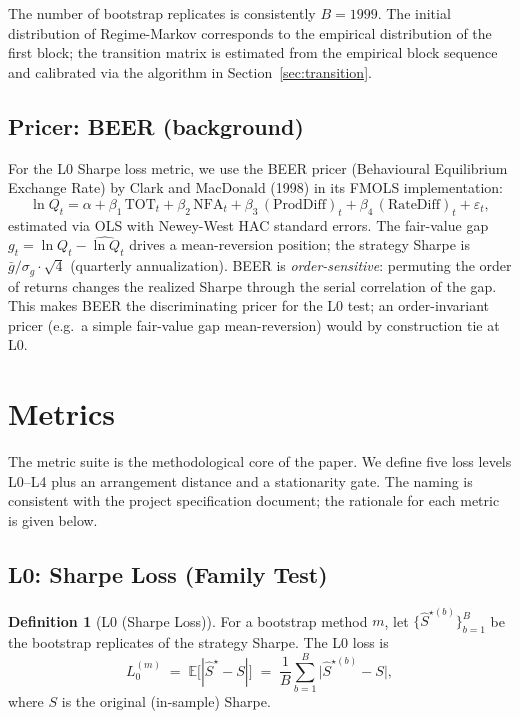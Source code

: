 \documentclass[11pt,a4paper]{article}
\theoremstyle{definition}
\newtheorem{definition}{Definition}
\begin{document}
The number of bootstrap replicates is consistently $B = 1999$. The initial distribution of Regime-Markov corresponds to the empirical distribution of the first block; the transition matrix is estimated from the empirical block sequence and calibrated via the algorithm in Section~\ref{sec:transition}.

\subsection{Pricer: BEER (background)}

For the L0 Sharpe loss metric, we use the BEER pricer (Behavioural Equilibrium Exchange Rate) by Clark and MacDonald (1998) in its FMOLS implementation:
\[
\ln Q_t = \alpha + \beta_1\, \text{TOT}_t + \beta_2\, \text{NFA}_t
+ \beta_3\, (\text{ProdDiff})_t + \beta_4\, (\text{RateDiff})_t
+ \varepsilon_t,
\]
estimated via OLS with Newey-West HAC standard errors. The fair-value gap $g_t = \ln Q_t - \widehat{\ln Q}_t$ drives a mean-reversion position; the strategy Sharpe is $\bar{g}/\sigma_g \cdot \sqrt{4}$ (quarterly annualization). BEER is \emph{order-sensitive}: permuting the order of returns changes the realized Sharpe through the serial correlation of the gap. This makes BEER the discriminating pricer for the L0 test; an order-invariant pricer (e.g.\ a simple fair-value gap mean-reversion) would by construction tie at L0.

\section{Metrics}
\label{sec:metrics}

The metric suite is the methodological core of the paper. We define five loss levels L0--L4 plus an arrangement distance and a stationarity gate. The naming is consistent with the project specification document; the rationale for each metric is given below.

\subsection{L0: Sharpe Loss (Family Test)}

\begin{definition}[L0 (Sharpe Loss)]
For a bootstrap method $m$, let $\{\widehat{S}^{\star (b)}\}_{b=1}^{B}$ be the bootstrap replicates of the strategy Sharpe. The L0 loss is
\[
L_0^{(m)} \;=\; \mathbb{E}\bigl[|\widehat{S}^{\star} - S|\bigr]
\;=\; \frac{1}{B}\sum_{b=1}^{B}
\bigl|\widehat{S}^{\star (b)} - S\bigr|,
\]
where $S$ is the original (in-sample) Sharpe.
\end{definition}
\end{document}
